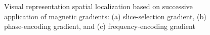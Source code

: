 \begin{figure}[ht]
\centering
{}
%
\caption{Visual representation spatial localization based on successive application of magnetic gradients: (a) slice-selection gradient, (b) phase-encoding gradient, and (c) frequency-encoding gradient~\cite{hendrick_1994}}
\label{fig:mr3}
\end{figure}

